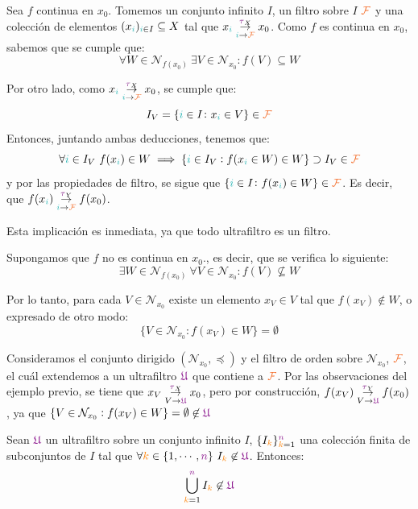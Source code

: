 \documentclass[titlepage,11pt,a4paper]{book}
\newcommand{\filt}{\ensuremath{\textcolor{Orange}{\mathcal{F}}}}
\newcommand{\ultf}{\ensuremath{\textcolor{Plum}{\mathfrak{U}}}}
\newcommand{\ii}{\ensuremath{\textcolor{TealBlue}{i}}}
\newcommand{\nn}{\ensuremath{\textcolor{Plum}{n}}}
\newcommand{\taut}{\textcolor{Fuchsia}{\tau}}
\newcommand{\kk}{\textcolor{orange}{k}}
\newcommand{\borde}[1]{%
  \begingroup
  \setlength{\fboxsep}{2.5pt}%
  \setlength{\fboxrule}{1pt}%
  \textcolor{black}{\fbox{\normalcolor\ensuremath{#1}}}%
  \hspace{4pt}%
  \vspace{0.5 pt}
  \endgroup
}
\begin{document}
    \begin{dem}
    
        \borde{(1) \implies (2)} Sea $f$ continua en $x_0$. Tomemos un conjunto infinito $I$, un filtro sobre $I$ $\filt$ y una colección de elementos $(x_{\ii})_{\ii \in I} \subseteq X$ tal que $x_{\ii} \underset{\ii \to \filt}{\overset{\taut_{X}}{\to}} x_{0}$. Como $f$ es continua en $x_{0}$, sabemos que se cumple que:
        \[
        \forall W \in \mathcal{N}_{f(x_0)} \ \exists V \in \mathcal{N}_{x_0} : f(V) \subseteq W
        \]

        \medskip
        Por otro lado, como $x_{\ii} \underset{\ii \to \filt}{\overset{\taut_{X}}{\to}} x_{0}$, se cumple que:
        \[
        I_{V} = \{\ii \in I \colon x_{\ii} \in V\} \in \filt
        \]
        Entonces, juntando ambas deducciones, tenemos que:
        \[
        \forall \ii \in I_{V} \ f(x_{\ii}) \in W \implies \{\ii \in I_{V} : f(x_{\ii} \in W) \in W\} \supset I_{V} \in \filt
        \]
        y por las propiedades de filtro, se sigue que $\{\ii \in I \colon f(x_{\ii}) \in W\} \in \filt$. Es decir, que $f(x_{\ii}) \underset{\ii \to \filt}{\overset{\taut_{Y}}{\to}} f(x_{0})$.

        \borde{(2) \implies (3)} Esta implicación es inmediata, ya que todo ultrafiltro es un filtro.

        \borde{(3) \implies (1)} Supongamos que $f$ no es continua en $x_0$., es decir, que se verifica lo siguiente:
        \[
        \exists W \in \mathcal{N}_{f(x_0)} \ \forall V \in \mathcal{N}_{x_0} : f(V) \not \subseteq W
        \]

        Por lo tanto, para cada $V \in \mathcal{N}_{x_0}$ existe un elemento $x_{V} \in V$ tal que $f(x_{V}) \not \in W$, o expresado de otro modo:
        \[
        \{V \in \mathcal{N}_{x_0} :f(x_{V}) \in W\} = \emptyset
        \]

        \medskip
        Consideramos el conjunto dirigido $(\mathcal{N}_{x_0}, \preceq)$ y el filtro de orden sobre $\mathcal{N}_{x_0}$, $\filt$, el cuál extendemos a un ultrafiltro $\ultf$ que contiene a $\filt$. Por las observaciones del ejemplo previo, se tiene que $x_{V} \underset{V \to \ultf}{\overset{\taut_{X}}{\to}} x_{0}$, pero por construcción, $f(x_{V}) \underset{V \to \ultf}{\overset{\taut_{Y}}{\to}} f(x_{0})$, ya que $\{V \in \mathcal{N}_{x_0} : f(x_{V}) \in W\} = \emptyset \not \in \ultf$
    \end{dem}

    \begin{lem*}{}
    Sean $\ultf$ un ultrafiltro sobre un conjunto infinito $I$, $\{I_{\kk}\}_{\kk = 1}^{\nn}$ una colección finita de subconjuntos de $I$ tal que $\forall \kk \in \{1, \cdots, \nn\} \ I_{\kk} \not \in \ultf$. Entonces:
    \[
    \bigcup_{\kk=1}^{\nn} I_{\kk} \not \in \ultf
    \]
    \end{lem*}
\end{document}
